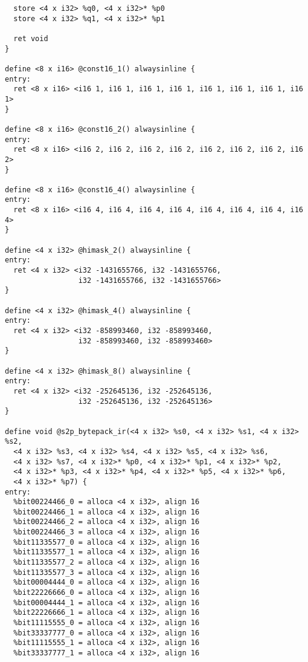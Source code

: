 \begin{lstlisting}
  store <4 x i32> %q0, <4 x i32>* %p0
  store <4 x i32> %q1, <4 x i32>* %p1

  ret void
}

define <8 x i16> @const16_1() alwaysinline {
entry:
  ret <8 x i16> <i16 1, i16 1, i16 1, i16 1, i16 1, i16 1, i16 1, i16 1>
}

define <8 x i16> @const16_2() alwaysinline {
entry:
  ret <8 x i16> <i16 2, i16 2, i16 2, i16 2, i16 2, i16 2, i16 2, i16 2>
}

define <8 x i16> @const16_4() alwaysinline {
entry:
  ret <8 x i16> <i16 4, i16 4, i16 4, i16 4, i16 4, i16 4, i16 4, i16 4>
}

define <4 x i32> @himask_2() alwaysinline {
entry:
  ret <4 x i32> <i32 -1431655766, i32 -1431655766,
                 i32 -1431655766, i32 -1431655766>
}

define <4 x i32> @himask_4() alwaysinline {
entry:
  ret <4 x i32> <i32 -858993460, i32 -858993460,
                 i32 -858993460, i32 -858993460>
}

define <4 x i32> @himask_8() alwaysinline {
entry:
  ret <4 x i32> <i32 -252645136, i32 -252645136,
                 i32 -252645136, i32 -252645136>
}

define void @s2p_bytepack_ir(<4 x i32> %s0, <4 x i32> %s1, <4 x i32> %s2,
  <4 x i32> %s3, <4 x i32> %s4, <4 x i32> %s5, <4 x i32> %s6,
  <4 x i32> %s7, <4 x i32>* %p0, <4 x i32>* %p1, <4 x i32>* %p2,
  <4 x i32>* %p3, <4 x i32>* %p4, <4 x i32>* %p5, <4 x i32>* %p6,
  <4 x i32>* %p7) {
entry:
  %bit00224466_0 = alloca <4 x i32>, align 16
  %bit00224466_1 = alloca <4 x i32>, align 16
  %bit00224466_2 = alloca <4 x i32>, align 16
  %bit00224466_3 = alloca <4 x i32>, align 16
  %bit11335577_0 = alloca <4 x i32>, align 16
  %bit11335577_1 = alloca <4 x i32>, align 16
  %bit11335577_2 = alloca <4 x i32>, align 16
  %bit11335577_3 = alloca <4 x i32>, align 16
  %bit00004444_0 = alloca <4 x i32>, align 16
  %bit22226666_0 = alloca <4 x i32>, align 16
  %bit00004444_1 = alloca <4 x i32>, align 16
  %bit22226666_1 = alloca <4 x i32>, align 16
  %bit11115555_0 = alloca <4 x i32>, align 16
  %bit33337777_0 = alloca <4 x i32>, align 16
  %bit11115555_1 = alloca <4 x i32>, align 16
  %bit33337777_1 = alloca <4 x i32>, align 16


\end{lstlisting}
